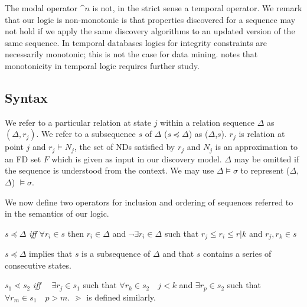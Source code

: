 \medskip

The modal operator $\bm^n$ is not, in the strict sense a temporal
operator. We remark that our logic is non-monotonic is that properties
discovered for a sequence may not hold if we apply the same discovery
algorithms to an updated version of the same sequence. In temporal
databases logics for integrity constraints are necessarily
monotonic; this is not the case for data mining.  \cite{ghr94} notes
that monotonicity in temporal logic requires further study. 


\subsection{Syntax}



We refer to a particular relation at state $j$ within a relation
sequence $\Delta$ as $(\Delta,r_j)$. We refer to a subsequence $s$ of
$\Delta$ ($s \preceq \Delta$) as ($\Delta$,$s$).
$r_j$ is relation at point $j$ and $r_j \models N_j$, the set of
NDs satisfied by $r_j$ and $N_j$ is an approximation to an FD set $F$
which is given as input in our discovery model.  
$\Delta$ may be omitted if the sequence is understood from the context.
We may use $\Delta \models \sigma$ to represent ($\Delta$,$\Delta$)
$\models \sigma$.

We now define two operators for inclusion and ordering of sequences
referred to in the semantics of our logic. 

\begin{definition}
\begin{rm}
$s \preceq \Delta$ {\em iff} $\forall r_i \in s$ then $r_i \in \Delta$
and $\neg \exists r_i \in \Delta$ such that $r_j \le r_i \le r|k$ and
$r_j,r_k \in s$
\end{rm}
\end{definition}

$s \preceq \Delta$ implies that $s$ is a subsequence of $\Delta$ and
that $s$ contains a series of consecutive states.


\begin{definition}
\begin{rm}
$s_1 \lessdot s_2$ {\em iff} $\quad \exists r_j \in s_1$ such that $\forall r_k
\in s_2 \quad j < k$ and $\exists r_p \in s_2$ such that $\forall r_m
\in s_1 \quad p > m$. $\gtrdot$ is defined similarly.
\end{rm}
\end{definition}

